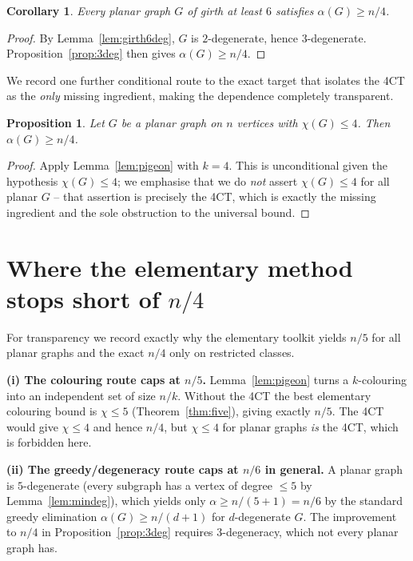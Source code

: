 \documentclass{amsart}
\newtheorem{corollary}{Corollary}
\newtheorem{proposition}{Proposition}
\theoremstyle{remark}
\begin{document}
\begin{corollary}\label{cor:girth}
Every planar graph $G$ of girth at least $6$ satisfies $\alpha(G)\ge n/4$.
\end{corollary}

\begin{proof}
By Lemma~\ref{lem:girth6deg}, $G$ is $2$-degenerate, hence $3$-degenerate.
Proposition~\ref{prop:3deg} then gives $\alpha(G)\ge n/4$.
\end{proof}

We record one further conditional route to the exact target that isolates the
4CT as the \emph{only} missing ingredient, making the dependence completely
transparent.

\begin{proposition}\label{prop:cond}
Let $G$ be a planar graph on $n$ vertices with $\chi(G)\le4$. Then
$\alpha(G)\ge n/4$.
\end{proposition}

\begin{proof}
Apply Lemma~\ref{lem:pigeon} with $k=4$. This is unconditional given the
hypothesis $\chi(G)\le4$; we emphasise that we do \emph{not} assert
$\chi(G)\le4$ for all planar $G$ -- that assertion is precisely the 4CT, which is
exactly the missing ingredient and the sole obstruction to the universal bound.
\end{proof}

\section{Where the elementary method stops short of \texorpdfstring{$n/4$}{n/4}}
\label{sec:gap}

For transparency we record exactly why the elementary toolkit yields $n/5$ for
all planar graphs and the exact $n/4$ only on restricted classes.

\medskip
\noindent\textbf{(i) The colouring route caps at $n/5$.}
Lemma~\ref{lem:pigeon} turns a $k$-colouring into an independent set of size
$n/k$. Without the 4CT the best elementary colouring bound is $\chi\le5$
(Theorem~\ref{thm:five}), giving exactly $n/5$. The 4CT would give $\chi\le4$ and
hence $n/4$, but $\chi\le4$ for planar graphs \emph{is} the 4CT, which is
forbidden here.

\medskip
\noindent\textbf{(ii) The greedy/degeneracy route caps at $n/6$ in general.}
A planar graph is $5$-degenerate (every subgraph has a vertex of degree $\le5$ by
Lemma~\ref{lem:mindeg}), which yields only $\alpha\ge n/(5+1)=n/6$ by the standard
greedy elimination $\alpha(G)\ge n/(d+1)$ for $d$-degenerate $G$. The improvement
to $n/4$ in Proposition~\ref{prop:3deg} requires $3$-degeneracy, which not every
planar graph has.
\end{document}
